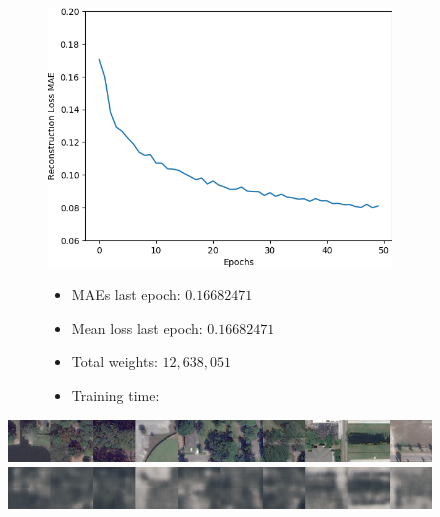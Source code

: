 \vspace{-3em}

\begin{figure}[H]
    \centering
    \begin{subfigure}{.5\textwidth}
        \centering
        \includegraphics[width=\textwidth]
        {images/figures/experiments_architecture/mae_graphKernel3adjusted2x2x256_dim1024.png}
    \end{subfigure}%
    \begin{subfigure}{.5\textwidth}
      \begin{itemize}
          \item MAEs last epoch: $0.16682471$
          \item Mean loss last epoch: $0.16682471$
          \item Total weights: $12,638,051$
          \item Training time:
      \end{itemize}
    \end{subfigure}
\end{figure}

\vspace{-2em}

\begin{figure}[H]
    \centering
    \includegraphics[width=\textwidth]
    {images/figures/experiments_architecture/inputsKernel3adjusted2x2x256_dim1024.png}
    \includegraphics[width=\textwidth]
    {images/figures/experiments_architecture/reconstructionsKernel3adjusted2x2x256_dim1024.png}
\end{figure}



